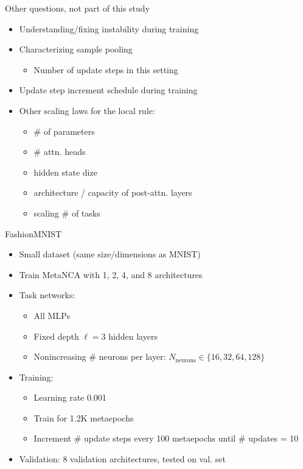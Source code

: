 \documentclass[aspectratio=169,11pt]{beamer}
\begin{document}
\begin{frame}{Other questions, not part of this study}

  \begin{itemize}
    \item Understanding/fixing instability during training
    \item Characterizing sample pooling
        \begin{itemize}
            \item Number of update steps in this setting
        \end{itemize}
    \item Update step increment schedule during training
    \item Other scaling laws for the local rule:
        \begin{itemize}
            \item \# of parameters
            \item \# attn. heads 
            \item hidden state dize
            \item architecture / capacity of post-attn. layers
            \item scaling \# of tasks
        \end{itemize}
  \end{itemize}
\end{frame}

\begin{frame}{FashionMNIST}

  \begin{itemize}
    \item Small dataset (same size/dimensions as MNIST)
    \item Train MetaNCA with 1, 2, 4, and 8 architectures
    \item Task networks: 
        \begin{itemize}
            \item All MLPs
            \item Fixed depth $\ell = 3$ hidden layers
            \item Nonincreasing \# neurons per layer:
                $N_\mathrm{neurons} \in \{16, 32, 64, 128 \}$
        \end{itemize}
    \item Training:
        \begin{itemize}
            \item Learning rate 0.001
            \item Train for 1.2K metaepochs
            \item Increment \# update steps every 100 metaepochs until \# updates = 10
        \end{itemize}
    \item Validation: 8 validation architectures, tested on val. set
  \end{itemize}
\end{frame}
\end{document}
